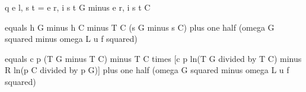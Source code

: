 q e l, s t = e r, i s t G minus e r, i s t C

equals h G minus h C minus T C (s G minus s C) plus one half (omega G squared minus omega L u f squared)

equals c p (T G minus T C) minus T C times [c p ln(T G divided by T C) minus R ln(p C divided by p G)] plus one half (omega G squared minus omega L u f squared)